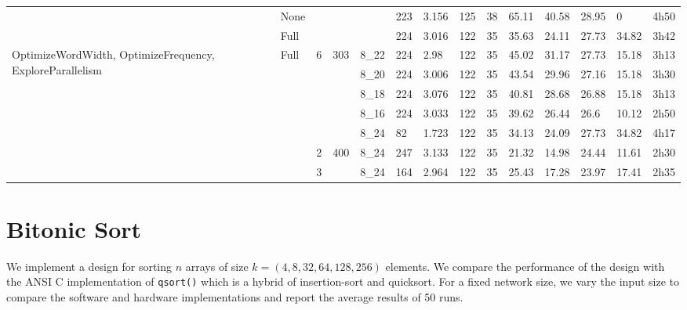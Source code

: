 \begin{table}
\begin{tabularx}{\textwidth}{p{3.5cm}|X|X|X|X|X|X|X|X|X|X|X|X|X|}
            & None        &     &          &       & 223             & 3.156          & 125                & 38                & 65.11    & 40.58  & 28.95     & 0        & 4h50       \\
            & Full        &     &          &       & 224             & 3.016          &	122                & 35                & 35.63    & 24.11  & 27.73     & 34.82    & 3h42       \\
            \hline
    \multirow{5}{2cm}{OptimizeWordWidth, OptimizeFrequency, ExploreParallelism}        & Full        & 6   & 303      & 8\_22 & 224             & 2.98           & 122                & 35                & 45.02    & 31.17  & 27.73     & 15.18    & 3h13       \\
            &             &     &          & 8\_20 & 224             & 3.006          &	122                & 35                & 43.54    & 29.96  & 27.16     & 15.18    & 3h30       \\
            &             &     &          & 8\_18 & 224             & 3.076          & 122                & 35                & 40.81    & 28.68  & 26.88     & 15.18    & 3h13       \\
            &             &     &          & 8\_16 & 224             & 3.033          & 122                & 35                & 39.62    & 26.44  & 26.6      & 10.12    & 2h50       \\
            &             &     &          & 8\_24 & 82              & 1.723          & 122                & 35                & 34.13    & 24.09  & 27.73     & 34.82    & 4h17       \\
            \hline
            &             & 2   & 400      & 8\_24 & 247             & 3.133          &	122                & 35                & 21.32    & 14.98  & 24.44     & 11.61    & 2h30       \\
            &             & 3   &          & 8\_24 & 164             & 2.964          & 122                & 35                & 25.43    & 17.28  & 23.97     & 17.41    & 2h35       \\

  \end{tabularx}
\end{table}


\section{Bitonic Sort}

We implement a design for sorting $n$ arrays of size $k = (4, 8, 32,
64, 128, 256)$ elements. We compare the performance of the design with
the ANSI C implementation of \texttt{qsort()} which is a hybrid of
insertion-sort and quicksort. For a fixed network size, we vary the
input size to compare the software and hardware implementations and
report the average results of 50 runs.



